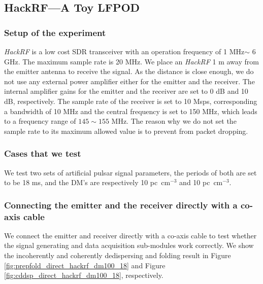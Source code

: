 \documentclass[fleqn,usenatbib]{mnras}
\begin{document}
\subsection{HackRF---A Toy LFPOD}
\subsubsection{Setup of the experiment}
\textit{HackRF} is a low cost SDR transceiver with an operation frequency of 1 MHz$\sim$ 6 GHz.
The maximum sample rate is 20 MHz.
We place an \textit{HackRF} 1 m away from the emitter antenna to receive the signal.
As the distance is close enough, we do not use any external power amplifier either for the emitter and the receiver. 
The internal amplifier gains for the emitter and the receiver are set to 0 dB and 10 dB, respectively.
The sample rate of the receiver is set to 10 Msps, corresponding a bandwidth of 10 MHz and the central frequency is set to 150 MHz, which leads to a frequency range of $145\sim 155$ MHz.
The reason why we do not set the sample rate to its maximum allowed value is to prevent from packet dropping.

\subsubsection{Cases that we test}
We test two sets of artificial pulsar signal parameters, the periods of both are set to be 18 ms, and the DM's are respectively 10 pc~cm$^{-3}$ and 10 pc~cm$^{-3}$.

\subsubsection{Connecting the emitter and the receiver directly with a co-axis cable}
We connect the emitter and receiver directly with a co-axis cable to test whether the signal generating and data acquisition sub-modules work correctly.
We show the incoherently and coherently dedispersing and folding result in Figure \ref{fig:prepfold_direct_hackrf_dm100_18} and Figure \ref{fig:cddsp_direct_hackrf_dm100_18}, respectively.
\end{document}
